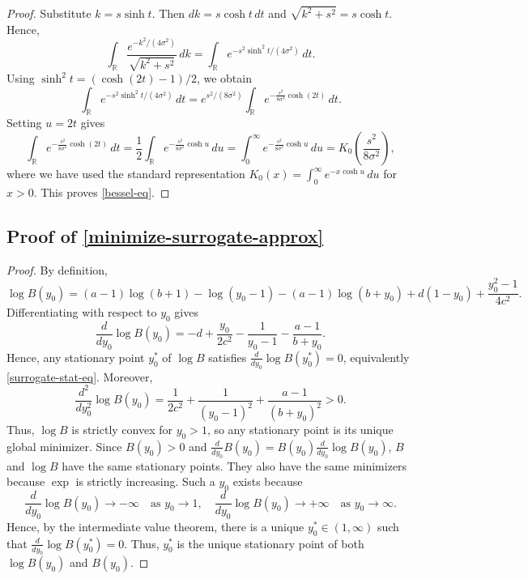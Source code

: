 \documentclass[10pt,reqno]{article}
\numberwithin{equation}{section}
\theoremstyle{plain}
\theoremstyle{definition}
\begin{document}
\begin{proof}
Substitute \(k=s\sinh t\). Then \(dk=s\cosh t\,dt\) and \(\sqrt{k^2+s^2}=s\cosh t\). Hence,
\begin{equation}
\int_{\mathbb{R}}\frac{e^{-k^2/(4\sigma^2)}}{\sqrt{k^2+s^2}}\,dk = \int_{\mathbb{R}}e^{-s^2\sinh^2 t/(4\sigma^2)}\,dt.
\end{equation}
Using \(\sinh^2 t=(\cosh(2t)-1)/2\), we obtain
\begin{equation}
\int_{\mathbb{R}}e^{-s^2\sinh^2 t/(4\sigma^2)}\,dt = e^{s^2/(8\sigma^2)}\int_{\mathbb{R}}e^{-\frac{s^2}{8\sigma^2}\cosh(2t)}\,dt.
\end{equation}
Setting \(u=2t\) gives
\begin{equation}
\int_{\mathbb{R}}e^{-\frac{s^2}{8\sigma^2}\cosh(2t)}\,dt = \frac{1}{2}\int_{\mathbb{R}}e^{-\frac{s^2}{8\sigma^2}\cosh u}\,du = \int_0^\infty e^{-\frac{s^2}{8\sigma^2}\cosh u}\,du = K_0\left(\frac{s^2}{8\sigma^2}\right),
\end{equation}
where we have used the standard representation \(K_0(x)=\int_0^\infty e^{-x\cosh u}\,du\) for \(x>0\). This proves \cref{bessel-eq}.
\end{proof}

\subsection{Proof of \cref{minimize-surrogate-approx}}\label{proof-of-minimize-surrogate-approx}


\begin{proof}
By definition,
\begin{equation}
\log B(y_0) = (a-1)\log(b+1)-\log(y_0-1)-(a-1)\log(b+y_0)+d(1-y_0)+\frac{y_0^2-1}{4c^2}.
\end{equation}
Differentiating with respect to \(y_0\) gives
\begin{equation}
\frac{d}{dy_0}\log B(y_0) = -d+\frac{y_0}{2c^2}-\frac{1}{y_0-1}-\frac{a-1}{b+y_0}.
\end{equation}
Hence, any stationary point \(y_0^*\) of \(\log B\) satisfies \(\frac{d}{dy_0}\log B(y_0^*)=0\), equivalently \cref{surrogate-stat-eq}. Moreover,
\begin{equation}\label{inc-phi}
\frac{d^2}{dy_0^2}\log B(y_0) = \frac{1}{2c^2}+\frac{1}{(y_0-1)^2}+\frac{a-1}{(b+y_0)^2}>0.
\end{equation}
Thus, \(\log B\) is strictly convex for \(y_0>1\), so any stationary point is its unique global minimizer. Since \(B(y_0)>0\) and \(\frac{d}{dy_0}B(y_0)=B(y_0)\frac{d}{dy_0}\log B(y_0)\), \(B\) and \(\log B\) have the same stationary points. They also have the same minimizers because \(\exp\) is strictly increasing. Such a \(y_0\) exists because
\begin{equation}
\frac{d}{dy_0}\log B(y_0) \to -\infty \quad \text{as } y_0 \to 1, \quad \frac{d}{dy_0}\log B(y_0) \to +\infty \quad \text{as } y_0 \to \infty.
\end{equation}
Hence, by the intermediate value theorem, there is a unique \(y_0^\ast\in(1,\infty)\) such that \(\frac{d}{dy_0}\log B(y_0^\ast)=0\). Thus, \(y_0^\ast\) is the unique stationary point of both \(\log B(y_0)\) and \(B(y_0)\).
\end{proof}
\end{document}
